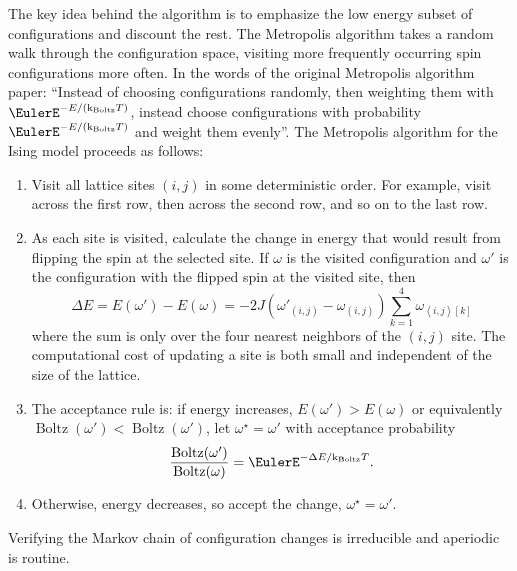 \documentclass[12pt]{article}
\begin{document}
The key idea behind the algorithm is to emphasize the low energy subset
of configurations and discount the rest.  The Metropolis algorithm%
takes a random walk through the configuration space, visiting more
frequently occurring spin configurations more often.  In the words of
the original Metropolis algorithm paper:  ``Instead of choosing
configurations randomly, then weighting them with \( \EulerE^{-E/(\text{k}_
{\text{Boltz}} T)} \), instead choose configurations with probability \(
\EulerE^{-E/(\text {k}_{\text{Boltz}} T)} \) and weight them evenly''.
The Metropolis algorithm for the Ising model proceeds as follows:
\begin{enumerate}
    \item
        Visit all lattice sites \( (i, j) \) in some deterministic
        order. For example, visit across the first row, then across the
        second row, and so on to the last row.
    \item
        As each site is visited, calculate the change in energy that
        would result from flipping the spin at the selected site.  If \(
        \omega \) is the visited configuration and \( \omega' \) is the
        configuration with the flipped spin at the visited site, then
        \[
            \Delta E = E(\omega') - E(\omega) = -2J (\omega'_{(i,j)} -
            \omega_{(i,j)}) \sum\limits_{k=1}^4\omega_{\left\langle i,j
            \right\rangle[k]}
        \] where the sum is only over the four nearest neighbors of the \(
        (i, j) \) site.  The computational cost of updating a site is
        both small and independent of the size of the lattice.
    \item
        The acceptance rule is: if energy increases, \( E(\omega') > E(\omega)
        \) or equivalently \(
        \operatorname{Boltz}
        (\omega') <
        \operatorname{Boltz}
        (\omega') \), let \( \omega^{\star} = \omega' \) with acceptance
        probability
        \[
            \frac{%
            \operatorname{Boltz}
            (\omega')}{%
            \operatorname{Boltz}
            (\omega)} = \EulerE^{-\Delta E/\text{k}_{\text{Boltz}} T}.
        \]
    \item
        Otherwise, energy decreases, so accept the change, \( \omega^{\star}
        = \omega' \).
\end{enumerate}
Verifying the Markov chain of configuration changes is irreducible and
aperiodic is routine.
\end{document}
